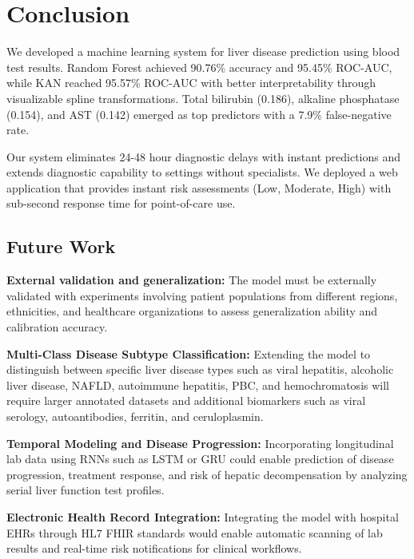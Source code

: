 \documentclass[conference]{IEEEtran}
\begin{document}
\section{Conclusion}

We developed a machine learning system for liver disease prediction using blood test results. Random Forest achieved 90.76\% accuracy and 95.45\% ROC-AUC, while KAN reached 95.57\% ROC-AUC with better interpretability through visualizable spline transformations. Total bilirubin (0.186), alkaline phosphatase (0.154), and AST (0.142) emerged as top predictors with a 7.9\% false-negative rate.

Our system eliminates 24-48 hour diagnostic delays with instant predictions and extends diagnostic capability to settings without specialists. We deployed a web application that provides instant risk assessments (Low, Moderate, High) with sub-second response time for point-of-care use.
\subsection{Future Work}

\textbf{External validation and generalization:} The model must be externally validated with experiments involving patient populations from different regions, ethnicities, and healthcare organizations to assess generalization ability and calibration accuracy.

\textbf{Multi-Class Disease Subtype Classification:} Extending the model to distinguish between specific liver disease types such as viral hepatitis, alcoholic liver disease, NAFLD, autoimmune hepatitis, PBC, and hemochromatosis will require larger annotated datasets and additional biomarkers such as viral serology, autoantibodies, ferritin, and ceruloplasmin.

\textbf{Temporal Modeling and Disease Progression:} Incorporating longitudinal lab data using RNNs such as LSTM or GRU could enable prediction of disease progression, treatment response, and risk of hepatic decompensation by analyzing serial liver function test profiles.

\textbf{Electronic Health Record Integration:} Integrating the model with hospital EHRs through HL7 FHIR standards would enable automatic scanning of lab results and real-time risk notifications for clinical workflows.
\end{document}

